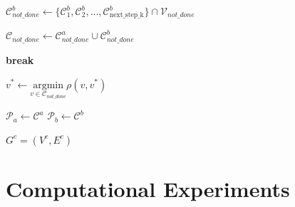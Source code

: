 \documentclass{article}
\begin{document}
\begin{algorithm}
\begin{algorithmic}[1]
        \State $\mathcal{C}^b_{not\_done} \gets \{\mathcal{C}^b_1, \mathcal{C}^b_2, ..., \mathcal{C}^b_{ \text{next\_step\_k} } \}  \cap \mathcal{V}_{not\_done}$
        
        
        \State $\mathcal{C}_{not\_done} \gets \mathcal{C}^a_{not\_done} \cup \mathcal{C}^b_{not\_done}$
        
            \State \textbf{break}
        \EndIf
        
        \State $v^* \gets \underset{v \in \mathcal{C}_{not\_done}}{\mathrm{argmin}} \rho(v, v^*)$
        
        \State $\mathcal{P}_a \gets \mathcal{C}^a$
        \State $\mathcal{P}_b \gets \mathcal{C}^b$
    \EndWhile
\EndWhile

\State \Return $G^c=(V^c,E^c)$


\end{algorithmic}
    \end{algorithm}

\section{Computational Experiments}

\end{document}
